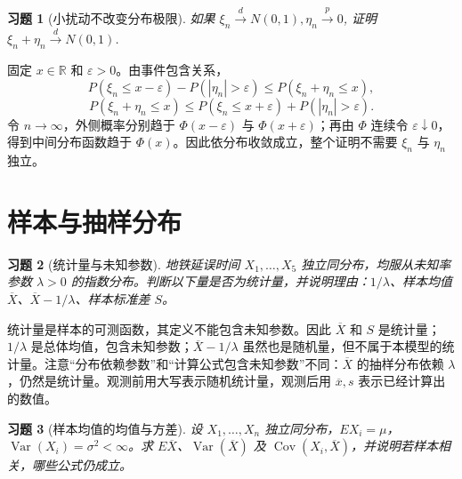 \documentclass[UTF8,12pt,a4paper,fontset=fandol]{ctexart}
\newtheorem{exercise}{习题}[section]
\begin{document}
\begin{exercise}[小扰动不改变分布极限]\label{q:A7.25}
如果 $\xi_n\xrightarrow{d}N(0,1),\eta_n\xrightarrow{p}0$, 证明 $\xi_n+\eta_n\xrightarrow{d}N(0,1)$.\par{}
\end{exercise}

\begin{solve}\label{a:A7.25}固定 $x\in\mathbb R$ 和 $\varepsilon>0$。由事件包含关系，\[P(\xi_n\le x-\varepsilon)-P(|\eta_n|>\varepsilon)\le P(\xi_n+\eta_n\le x),\]\[P(\xi_n+\eta_n\le x)\le P(\xi_n\le x+\varepsilon)+P(|\eta_n|>\varepsilon).\]令 $n\to\infty$，外侧概率分别趋于 $\Phi(x-\varepsilon)$ 与 $\Phi(x+\varepsilon)$；再由 $\Phi$ 连续令 $\varepsilon\downarrow0$，得到中间分布函数趋于 $\Phi(x)$。因此依分布收敛成立，整个证明不需要 $\xi_n$ 与 $\eta_n$ 独立。\end{solve}

\clearpage\section{样本与抽样分布}

\begin{exercise}[统计量与未知参数]\label{q:M-F-C4}
地铁延误时间 $X_1,\ldots,X_5$ 独立同分布，均服从未知率参数 $\lambda>0$ 的指数分布。判断以下量是否为统计量，并说明理由：$1/\lambda$、样本均值 $\overline X$、$\overline X-1/\lambda$、样本标准差 $S$。\par{}
\end{exercise}

\begin{solve}\label{a:M-F-C4}统计量是样本的可测函数，其定义不能包含未知参数。因此 $\overline X$ 和 $S$ 是统计量；$1/\lambda$ 是总体均值，包含未知参数；$\overline X-1/\lambda$ 虽然也是随机量，但不属于本模型的统计量。注意“分布依赖参数”和“计算公式包含未知参数”不同：$\overline X$ 的抽样分布依赖 $\lambda$，仍然是统计量。观测前用大写表示随机统计量，观测后用 $\overline x,s$ 表示已经计算出的数值。\end{solve}

\begin{exercise}[样本均值的均值与方差]\label{q:B8.1}
设 $X_1,\ldots,X_n$ 独立同分布，$EX_i=\mu$，$\operatorname{Var}(X_i)=\sigma^2<\infty$。求 $E\overline X$、$\operatorname{Var}(\overline X)$ 及 $\operatorname{Cov}(X_i,\overline X)$，并说明若样本相关，哪些公式仍成立。\par{}
\end{exercise}
\end{document}
